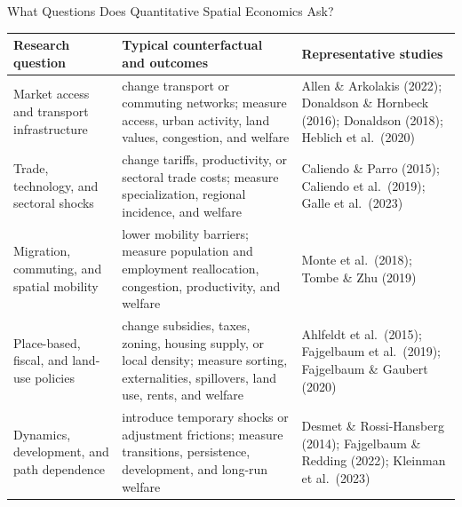 \documentclass[aspectratio=169,11pt]{beamer}
\begin{document}
\begin{frame}{What Questions Does Quantitative Spatial Economics Ask?}
  \scriptsize
  \renewcommand{\arraystretch}{0.98}
  \begin{center}
  \begin{tabular}{
    >{\raggedright\arraybackslash}p{}
    >{\raggedright\arraybackslash}p{}
    >{\raggedright\arraybackslash}p{}}
    \toprule
    Research question & Typical counterfactual and outcomes
      & Representative studies \\
    \midrule
    Market access and transport infrastructure
      & change transport or commuting networks; measure access, urban activity,
        land values, congestion, and welfare
      & Allen \& Arkolakis (2022); Donaldson \& Hornbeck (2016);
        Donaldson (2018); Heblich et al.\ (2020) \\
    Trade, technology, and sectoral shocks
      & change tariffs, productivity, or sectoral trade costs; measure
        specialization, regional incidence, and welfare
      & Caliendo \& Parro (2015); Caliendo et al.\ (2019);
        Galle et al.\ (2023) \\
    Migration, commuting, and spatial mobility
      & lower mobility barriers; measure population and employment
        reallocation, congestion, productivity, and welfare
      & Monte et al.\ (2018); Tombe \& Zhu (2019) \\
    Place-based, fiscal, and land-use policies
      & change subsidies, taxes, zoning, housing supply, or local density;
        measure sorting, externalities, spillovers, land use, rents, and welfare
      & Ahlfeldt et al.\ (2015); Fajgelbaum et al.\ (2019);
        Fajgelbaum \& Gaubert (2020) \\
    Dynamics, development, and path dependence
      & introduce temporary shocks or adjustment frictions; measure transitions,
        persistence, development, and long-run welfare
      & Desmet \& Rossi-Hansberg (2014); Fajgelbaum \& Redding (2022);
        Kleinman et al.\ (2023) \\
    \bottomrule
  \end{tabular}
  \end{center}
\end{frame}
\end{document}
